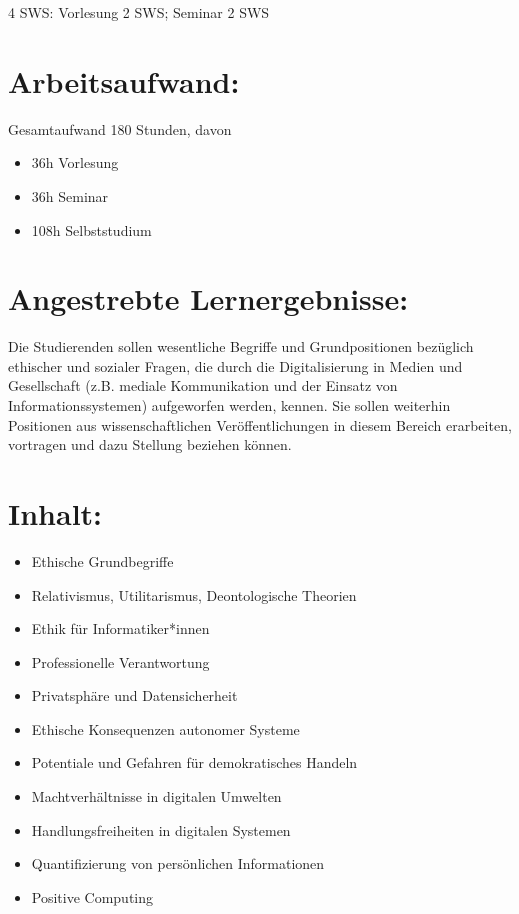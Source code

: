 4 SWS: Vorlesung 2 SWS; Seminar 2 SWS

\section*{Arbeitsaufwand:}\label{arbeitsaufwand}

Gesamtaufwand 180 Stunden, davon

\begin{itemize}
\tightlist
\item
  36h Vorlesung
\item
  36h Seminar
\item
  108h Selbststudium
\end{itemize}

\section*{Angestrebte
Lernergebnisse:}\label{angestrebte-lernergebnisse}

Die Studierenden sollen wesentliche Begriffe und Grundpositionen
bezüglich ethischer und sozialer Fragen, die durch die Digitalisierung
in Medien und Gesellschaft (z.B. mediale Kommunikation und der Einsatz
von Informationssystemen) aufgeworfen werden, kennen. Sie sollen
weiterhin Positionen aus wissenschaftlichen Veröffentlichungen in diesem
Bereich erarbeiten, vortragen und dazu Stellung beziehen können.

\section*{Inhalt:}\label{inhalt}

\begin{itemize}
\tightlist
\item
  Ethische Grundbegriffe
\item
  Relativismus, Utilitarismus, Deontologische Theorien
\item
  Ethik für Informatiker*innen
\item
  Professionelle Verantwortung
\item
  Privatsphäre und Datensicherheit
\item
  Ethische Konsequenzen autonomer Systeme
\item
  Potentiale und Gefahren für demokratisches Handeln
\item
  Machtverhältnisse in digitalen Umwelten
\item
  Handlungsfreiheiten in digitalen Systemen
\item
  Quantifizierung von persönlichen Informationen
\item
  Positive Computing
\end{itemize}

